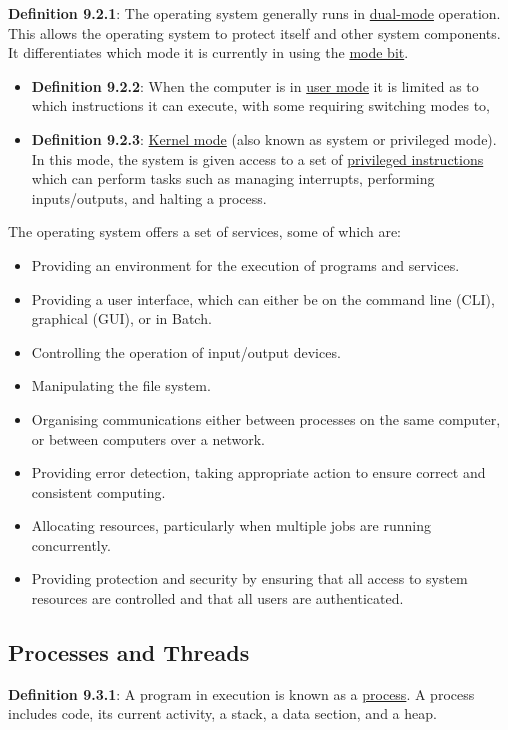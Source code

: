 \documentclass{article}
\newcommand{\separate}[1] {\vspace{#1 pt}\noindent}
\newcommand{\definition}[2]{\textbf{Definition #1}: #2\label{def:#1}}
\begin{document}
\separate{7}\definition{9.2.1}{The operating system generally runs in \underline{dual-mode} operation. This allows the operating system to protect itself and other system components. It differentiates which mode it is currently in using the \underline{mode bit}.}
\begin{itemize}
    \item \definition{9.2.2}{When the computer is in \underline{user mode} it is limited as to which instructions it can execute, with some requiring switching modes to,}
    \item \definition{9.2.3}{\underline{Kernel mode} (also known as system or privileged mode). In this mode, the system is given access to a set of \underline{privileged instructions} which can perform tasks such as managing interrupts, performing inputs/outputs, and halting a process.}
\end{itemize}

\separate{7}The operating system offers a set of services, some of which are:
\begin{itemize}
    \item Providing an environment for the execution of programs and services.
    \item Providing a user interface, which can either be on the command line (CLI), graphical (GUI), or in Batch.
    \item Controlling the operation of input/output devices.
    \item Manipulating the file system.
    \item Organising communications either between processes on the same computer, or between computers over a network.
    \item Providing error detection, taking appropriate action to ensure correct and consistent computing.
    \item Allocating resources, particularly when multiple jobs are running concurrently.
    \item Providing protection and security by ensuring that all access to system resources are controlled and that all users are authenticated.
\end{itemize}

\subsection{Processes and Threads}

\definition{9.3.1}{A program in execution is known as a \underline{process}. A process includes code, its current activity, a stack, a data section, and a heap.}
\end{document}
